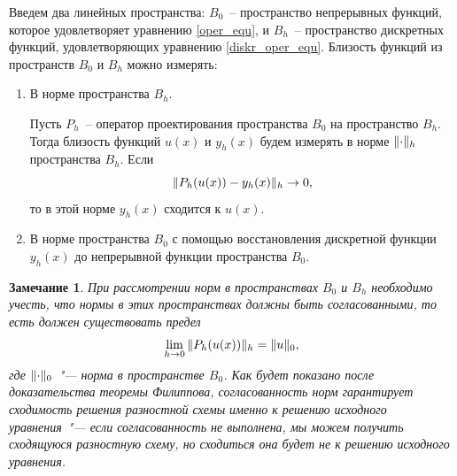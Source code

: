 \documentclass[11pt,a4paper,twoside]{report}
\numberwithin{equation}{section}
\theoremstyle{definition}
\theoremstyle{plain}
\newtheorem*{note*}{Замечание}
\DeclarePairedDelimiter\norm{\lVert}{\rVert}
\begin{document}
Введем два линейных пространства: $B_0$~-- пространство
непрерывных функций, которое удовлетворяет уравнению
\eqref{oper_equ}, и $B_h$~-- пространство дискретных функций, удовлетворяющих уравнению
\eqref{diskr_oper_equ}. Близость функций из пространств $B_0$ и $B_h$ можно измерять:
%
\begin{enumerate}
%
    \item
        В норме пространства $B_h$.

        Пусть $P_h$~-- оператор проектирования пространства $B_0$
        на пространство $B_h$. Тогда близость функций
        $u(x)$ и $y_h(x)$ будем измерять в норме $\norm{\cdot}_h$ пространства $B_h$.
        Если
        $$
            \norm{P_h(u(x))-y_h(x)}_h \rightarrow 0,
        $$
        то в этой норме $y_h(x)$ сходится к $u(x)$.
    \item
        В норме пространства $B_0$ с помощью восстановления
        дискретной функции $y_h(x)$ до непрерывной функции пространства $B_0$.
%
\end{enumerate}
%
\begin{note*}
%
    При рассмотрении норм в пространствах $B_0$ и $B_h$ необходимо учесть,
    что нормы в этих пространствах должны быть согласованными, то есть
    должен существовать предел
    \begin{equation}
        \label{norm_consistency}
        \lim\limits_{h\rightarrow0}{\norm{P_h(u(x))}_h} = \norm{u}_0,
    \end{equation}
    где $\norm{\cdot}_0$~"--- норма в пространстве $B_0$. Как будет показано после
    доказательства теоремы Филиппова, согласованность норм гарантирует сходимость
    решения разностной схемы именно к решению исходного уравнения~"--- если согласованность
    не выполнена, мы можем получить сходящуюся разностную схему, но сходиться она будет
    не к решению исходного уравнения.
%
\end{note*}
%
\end{document}

